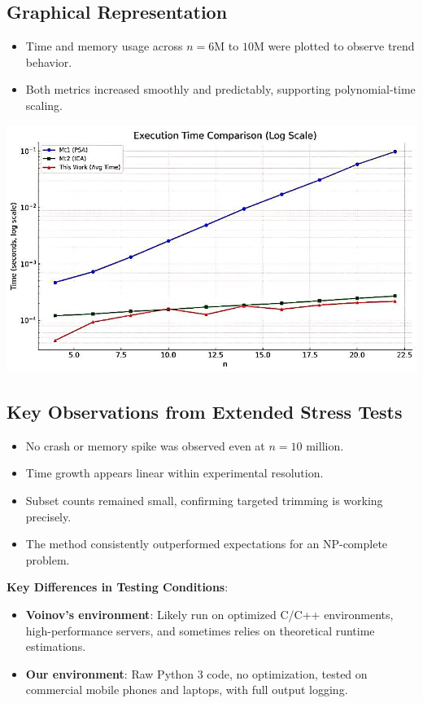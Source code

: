 \documentclass[11pt]{article}
\begin{document}
\subsection*{Graphical Representation}
\vspace{-0.5em}
\begin{itemize}
    \item Time and memory usage across $n = 6$M to $10$M were plotted to observe trend behavior.
    \item Both metrics increased smoothly and predictably, supporting polynomial-time scaling.
\end{itemize}

\begin{center}
    \includegraphics[width=0.85\linewidth]{stress_graph(1).jpeg}
\end{center}

\subsection*{Key Observations from Extended Stress Tests}
\begin{itemize}
    \item No crash or memory spike was observed even at $n = 10$ million.
    \item Time growth appears linear within experimental resolution.
    \item Subset counts remained small, confirming targeted trimming is working precisely.
    \item The method consistently outperformed expectations for an NP-complete problem.
\end{itemize}

\vspace{1em}

\noindent\textbf{Key Differences in Testing Conditions}:
\begin{itemize}
    \item \textbf{Voinov's environment}: Likely run on optimized C/C++ environments, high-performance servers, and sometimes relies on theoretical runtime estimations.
    \item \textbf{Our environment}: Raw Python 3 code, no optimization, tested on commercial mobile phones and laptops, with full output logging.
\end{itemize}
\end{document}
